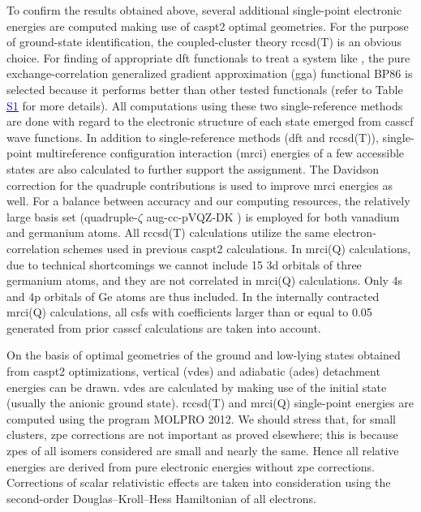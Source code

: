 \begin{refsection}
To confirm the results obtained above, several additional single-point electronic energies are computed making use of \acrshort{caspt2} optimal geometries. For the purpose of ground-state identification, the coupled-cluster theory \acrshort{rccsd}(T) is an obvious choice. For finding of appropriate \acrshort{dft} functionals to treat a system like , the pure exchange-correlation generalized gradient approximation (\acrshort{gga}) functional BP86 \cite{c5:22, c5:23} is selected because it performs better than other tested functionals (refer to Table \href{https://pubs.acs.org/doi/suppl/10.1021/acs.jpca.7b07459/suppl_file/jp7b07459_si_001.pdf}{\textcolor{blue}{S1}} for more details). All computations using these two single-reference methods are done with regard to the electronic structure of each state emerged from \acrshort{casscf} wave functions. In addition to single-reference methods (\acrshort{dft} and \acrshort{rccsd}(T)), single-point multireference configuration interaction (\acrshort{mrci}) energies of a few accessible states are also calculated to further support the assignment. The Davidson correction for the quadruple contributions is used to improve \acrshort{mrci} energies as well. For a balance between accuracy and our computing resources, the relatively large basis set (quadruple-$\zeta$ aug-cc-pVQZ-DK \cite{c5:24, c5:25}) is employed for both vanadium and germanium atoms. All \acrshort{rccsd}(T) calculations utilize the same electron-correlation schemes used in previous \acrshort{caspt2} calculations. In \acrshort{mrci}(Q) calculations, due to technical shortcomings we cannot include 15 3d orbitals of three germanium atoms, and they are not correlated in \acrshort{mrci}(Q) calculations. Only 4s and 4p orbitals of Ge atoms are thus included. In the internally contracted \acrshort{mrci}(Q) calculations, all \acrshort{csf}s with coefficients larger than or equal to 0.05 generated from prior \acrshort{casscf} calculations are taken into account.




On the basis of optimal geometries of the ground and low-lying states obtained from \acrshort{caspt2} optimizations, vertical (\acrshort{vde}s) and adiabatic (\acrshort{ade}s) detachment energies can be drawn. \acrshort{vde}s are calculated by making use of the initial state (usually the anionic ground state). \acrshort{rccsd}(T) and \acrshort{mrci}(Q) single-point energies are computed using the program MOLPRO 2012. \cite{c5:26} We should stress that, for small clusters, \acrshort{zpe} corrections are not important as proved elsewhere; \cite{c5:27} this is because \acrshort{zpe}s of all isomers considered are small and nearly the same. Hence all relative energies are derived from pure electronic energies without \acrshort{zpe} corrections. Corrections of scalar relativistic effects are taken into consideration using the second-order Douglas–Kroll–Hess Hamiltonian of all electrons. \cite{c5:28}




\end{refsection}

